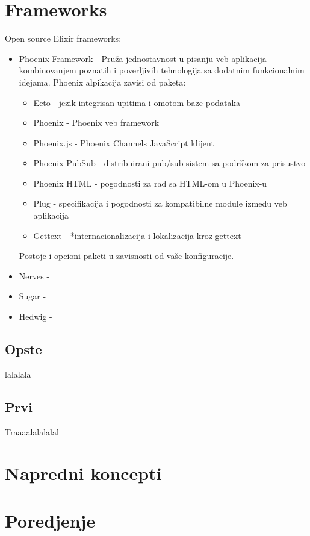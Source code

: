 \documentclass[a4paper]{article}
\begin{document}
\section{Frameworks}
Open source Elixir frameworks:
\begin{itemize}
    \item Phoenix Framework - Pruža jednostavnost u pisanju veb aplikacija kombinovanjem poznatih i poverljivih tehnologija sa dodatnim funkcionalnim idejama. Phoenix alpikacija zavisi od paketa:
    \begin{itemize}
        \item Ecto - jezik integrisan upitima i omotom baze podataka
        \item Phoenix - Phoenix veb framework
        \item Phoenix.js - Phoenix Channels JavaScript klijent
        \item Phoenix PubSub - distribuirani pub/sub sistem sa podrškom za prisustvo
        \item Phoenix HTML - pogodnosti za rad sa HTML-om u Phoenix-u
        \item Plug - specifikacija i pogodnosti za kompatibilne module između veb aplikacija
        \item Gettext - *internacionalizacija i lokalizacija kroz gettext
    \end{itemize}
    Postoje i opcioni paketi u zavisnosti od vaše konfiguracije.
    \item Nerves - 
    \item Sugar - 
    \item Hedwig -
\end{itemize}
\subsection{Opste}
lalalala
\subsection{Prvi}
Traaaalalalalal

\section{Napredni koncepti}

\section{Poredjenje}
\end{document}
